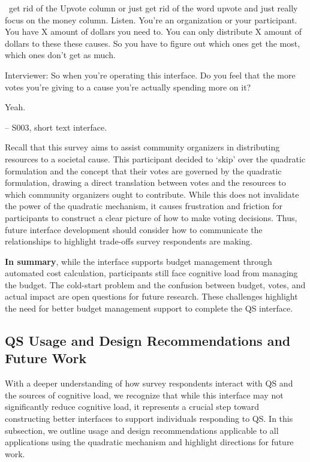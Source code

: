 \begin{displayquote}

~\bracketellipsis get rid of the Upvote column or just get rid of the word upvote and just really focus on the money column. Listen. You're an organization or your participant. You have X amount of dollars you need to. You can only distribute X amount of dollars to these these causes. So you have to figure out which ones get the most, which ones don't get as much.~\bracketellipsis 

Interviewer: So when you're operating this interface. Do you feel that the more votes you're giving to a cause you're actually spending more on it?

Yeah.
       
\noindent \hfill -- S003, short text interface.
\end{displayquote}
Recall that this survey aims to assist community organizers in distributing resources to a societal cause. This participant decided to `skip' over the quadratic formulation and the concept that their votes are governed by the quadratic formulation, drawing a direct translation between votes and the resources to which community organizers ought to contribute. While this does not invalidate the power of the quadratic mechanism, it causes frustration and friction for participants to construct a clear picture of how to make voting decisions. Thus, future interface development should consider how to communicate the relationships to highlight trade-offs survey respondents are making.

\textbf{In summary}, while the interface supports budget management through automated cost calculation, participants still face cognitive load from managing the budget. The cold-start problem and the confusion between budget, votes, and actual impact are open questions for future research. These challenges highlight the need for better budget management support to complete the QS interface.

\subsection{QS Usage and Design Recommendations and Future Work}
With a deeper understanding of how survey respondents interact with QS and the sources of cognitive load, we recognize that while this interface may not significantly reduce cognitive load, it represents a crucial step toward constructing better interfaces to support individuals responding to QS. In this subsection, we outline usage and design recommendations applicable to all applications using the quadratic mechanism and highlight directions for future work.

